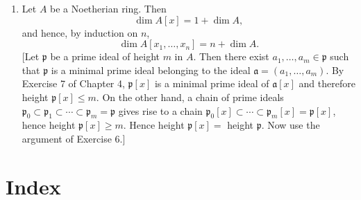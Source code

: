 \begin{enumerate}
\item Let $A$ be a Noetherian ring. Then
\[
 \dim A[x]=1+\dim A,
\]
and hence, by induction on $n$,
\[
 \dim A[x_1,\ldots,x_n]=n+\dim A.
\]
[Let $\mathfrak p$ be a prime ideal of height $m$ in $A$. Then there exist $a_1,\ldots,a_m\in\mathfrak p$ such that $\mathfrak p$ is a minimal prime ideal belonging to the ideal $\mathfrak a=(a_1,\ldots,a_m)$. By Exercise 7 of Chapter 4, $\mathfrak p[x]$ is a minimal prime ideal of $\mathfrak a[x]$ and therefore height $\mathfrak p[x]\leq m$. On the other hand, a chain of prime ideals $\mathfrak p_0\subset\mathfrak p_1\subset\cdots\subset\mathfrak p_m=\mathfrak p$ gives rise to a chain $\mathfrak p_0[x]\subset\cdots\subset\mathfrak p_m[x]=\mathfrak p[x]$, hence height $\mathfrak p[x]\geq m$. Hence height $\mathfrak p[x]=$ height $\mathfrak p$. Now use the argument of Exercise 6.]
\end{enumerate}

\section*{Index}

